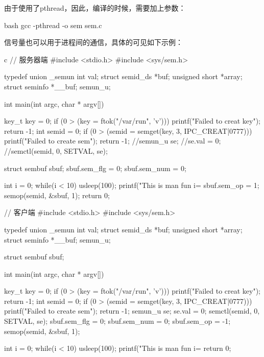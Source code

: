 由于使用了pthread，因此，编译的时候，需要加上参数：
\begin{code-block}{bash}
gcc -pthread -o sem sem.c
\end{code-block}

信号量也可以用于进程间的通信，具体的可见如下示例：
\begin{code-block}{c}
// 服务器端
#include <stdio.h>
#include <sys/sem.h>

typedef union _semun {
        int val;
        struct semid_ds *buf;
        unsigned short  *array;
        struct seminfo  *__buf;
}semun_u;

int main(int argc, char * argv[])
{
        key_t key = 0;
        if (0 > (key = ftok("/var/run", 'v')))
        {
                printf("Failed to creat key\n");
                return -1;
        }
        int semid = 0;
        if (0 > (semid = semget(key, 3, IPC_CREAT|0777)))
        {
                printf("Failed to create sem\n");
                return -1;
        }
        //semun_u se;
        //se.val = 0;
        //semctl(semid, 0, SETVAL, se);

        struct sembuf sbuf;
        sbuf.sem_flg = 0;
        sbuf.sem_num = 0;

        int i = 0;
        while(i < 10)
        {
                usleep(100);
                printf("This is man fun i=%
        }
        sbuf.sem_op = 1;
        semop(semid, &sbuf, 1);
        return 0;
}

// 客户端
#include <stdio.h>
#include <sys/sem.h>

typedef union _semun {
        int val;
        struct semid_ds *buf;
        unsigned short  *array;
        struct seminfo  *__buf;
}semun_u;

struct sembuf sbuf;

int main(int argc, char * argv[])
{
        key_t key = 0;
        if (0 > (key = ftok("/var/run", 'v')))
        {
                printf("Failed to creat key\n");
                return -1;
        }
        int semid = 0;
        if (0 > (semid = semget(key, 3, IPC_CREAT|0777)))
        {
                printf("Failed to create sem\n");
                return -1;
        }
        semun_u se;
        se.val = 0;
        semctl(semid, 0, SETVAL, se);
        sbuf.sem_flg = 0;
        sbuf.sem_num = 0;
        sbuf.sem_op = -1;
        semop(semid, &sbuf, 1);

        int i = 0;
        while(i < 10)
        {
                usleep(100);
                printf("This is man fun i=%
        }
        return 0;
}
\end{code-block}

